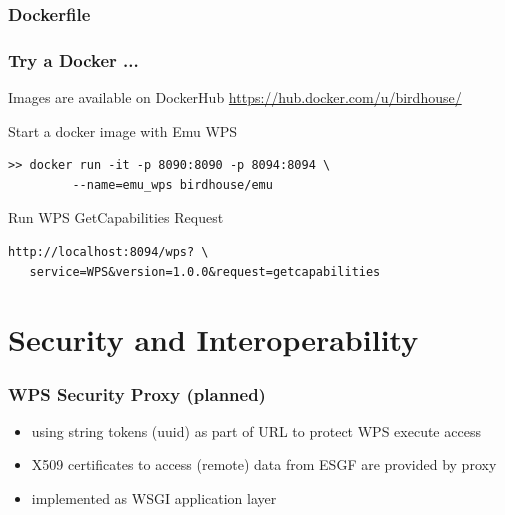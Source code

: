 \documentclass{beamer}
\begin{document}

  \begin{frame}
    \frametitle{Dockerfile}
    
\end{frame}


  \begin{frame}
    \frametitle{Try a Docker ...}
    \begin{block}{Images are available on DockerHub}
      \url{https://hub.docker.com/u/birdhouse/}
    \end{block}
    \begin{block}{Start a docker image with Emu WPS}
      \begin{verbatim}
>> docker run -it -p 8090:8090 -p 8094:8094 \
         --name=emu_wps birdhouse/emu  
      \end{verbatim}
    \end{block}
    \begin{block}{Run WPS GetCapabilities Request}
      \begin{verbatim}
http://localhost:8094/wps? \
   service=WPS&version=1.0.0&request=getcapabilities
      \end{verbatim}
    \end{block}
\end{frame}


  \section{Security and Interoperability}


  \begin{frame}[plain]
    \frametitle{WPS Security Proxy (planned)}
    \begin{itemize}
      \item using string tokens (uuid) as part of URL to protect WPS execute access
      \item X509 certificates to access (remote) data from ESGF are provided by proxy
      \item implemented as WSGI application layer
    \end{itemize}
    \begin{figure}
    \end{figure}
  \end{frame}
\end{document}
